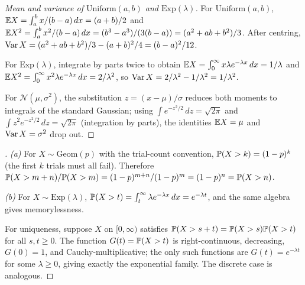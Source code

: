 \begin{proof}[Mean and variance of $\mathrm{Uniform}(a, b)$ and $\mathrm{Exp}(\lambda)$]
For $\mathrm{Uniform}(a, b)$,
$\mathbb{E} X = \int_a^b x/(b - a)\, dx = (a + b)/2$ and
$\mathbb{E} X^2 = \int_a^b x^2/(b - a)\, dx = (b^3 - a^3)/(3(b - a)) = (a^2 + ab + b^2)/3$.
After centring,
$\operatorname{Var} X = (a^2 + ab + b^2)/3 - (a + b)^2/4 = (b - a)^2/12$.

For $\mathrm{Exp}(\lambda)$, integrate by parts twice to obtain
$\mathbb{E} X = \int_0^{\infty} x \lambda e^{-\lambda x}\, dx = 1/\lambda$
and $\mathbb{E} X^2 = \int_0^{\infty} x^2 \lambda e^{-\lambda x}\, dx = 2/\lambda^2$,
so $\operatorname{Var} X = 2/\lambda^2 - 1/\lambda^2 = 1/\lambda^2$.

For $\mathcal{N}(\mu, \sigma^2)$, the substitution
$z = (x - \mu)/\sigma$ reduces both moments to integrals of the
standard Gaussian; using $\int e^{-z^2/2}\, dz = \sqrt{2\pi}$ and
$\int z^2 e^{-z^2/2}\, dz = \sqrt{2\pi}$ (integration by parts), the
identities $\mathbb{E} X = \mu$ and $\operatorname{Var} X = \sigma^2$ drop out.
\end{proof}

\begin{proof}[]
\emph{(a)} For $X \sim \mathrm{Geom}(p)$ with the trial-count
convention, $\mathbb{P}(X > k) = (1 - p)^k$ (the first $k$ trials must
all fail). Therefore
$\mathbb{P}(X > m + n)/\mathbb{P}(X > m) = (1 - p)^{m + n}/(1 - p)^m = (1 - p)^n = \mathbb{P}(X > n)$.

\emph{(b)} For $X \sim \mathrm{Exp}(\lambda)$,
$\mathbb{P}(X > t) = \int_t^{\infty} \lambda e^{-\lambda x}\, dx = e^{-\lambda t}$,
and the same algebra gives memorylessness.

For uniqueness, suppose $X$ on $[0, \infty)$ satisfies
$\mathbb{P}(X > s + t) = \mathbb{P}(X > s) \mathbb{P}(X > t)$ for all $s, t \geq 0$.
The function $G(t) = \mathbb{P}(X > t)$ is right-continuous, decreasing,
$G(0) = 1$, and Cauchy-multiplicative; the only such functions are
$G(t) = e^{-\lambda t}$ for some $\lambda \geq 0$, giving exactly
the exponential family. The discrete case is analogous.
\end{proof}

